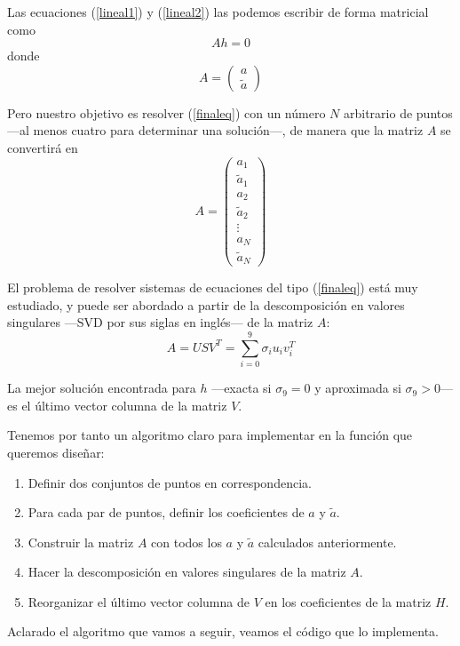 \documentclass[a4paper, 11pt]{article}
\theoremstyle{definition}
\theoremstyle{theorem}
\begin{document}
  Las ecuaciones (\ref{lineal1}) y (\ref{lineal2}) las podemos escribir de forma matricial como
  \begin{equation}
      Ah = 0 \label{finaleq}
  \end{equation}
  donde
  \[
  A = \begin{pmatrix}
      a \\
      \tilde{a}
  \end{pmatrix}
  \]

  Pero nuestro objetivo es resolver (\ref{finaleq}) con un número $N$ arbitrario de puntos ---al menos cuatro para determinar una solución---, de manera que la matriz $A$ se convertirá en
  \[
  A = \begin{pmatrix}
      a_1 \\
      \tilde{a}_1 \\
      a_2 \\
      \tilde{a}_2 \\
      \vdots  \\
      a_N \\
      \tilde{a}_N
  \end{pmatrix}
  \]

  El problema de resolver sistemas de ecuaciones del tipo (\ref{finaleq}) está muy estudiado, y puede ser abordado a partir de la descomposición en valores singulares ---SVD por sus siglas en inglés--- de la matriz $A$:
  \[
  A = USV^T = \sum_{i=0}^9 \sigma_i u_i v_i^T
  \]

  La mejor solución encontrada para $h$ ---exacta si $\sigma_9=0$ y aproximada si $\sigma_9 > 0$--- es el último vector columna de la matriz $V$.

  Tenemos por tanto un algoritmo claro para implementar en la función que queremos diseñar:
  \begin{enumerate}
      \item Definir dos conjuntos de puntos en correspondencia.
      \item Para cada par de puntos, definir los coeficientes de $a$ y $\tilde{a}$.
      \item Construir la matriz $A$ con todos los $a$ y $\tilde{a}$ calculados anteriormente.
      \item Hacer la descomposición en valores singulares de la matriz $A$.
      \item Reorganizar el último vector columna de $V$ en los coeficientes de la matriz $H$.
  \end{enumerate}

  Aclarado el algoritmo que vamos a seguir, veamos el código que lo implementa.
\end{document}
